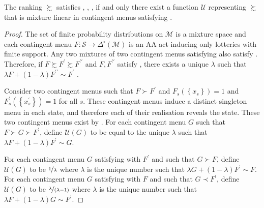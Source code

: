 \begin{lemma}\label{lem:pre2}
	The ranking \(\succsim\) satisfies , , ,  if and only there exist a function \( \mathscr{U} \) representing \( \succsim \) that is mixture linear in contingent menus satisfying .
\end{lemma}

\begin{proof}
	The set of finite probability distributions on \(\mathcal{M}\) is a mixture space and each contingent menu \( F : \mathcal{S} \rightarrow \Delta^{\circ} \left( \mathcal{M} \right) \) is an AA act inducing only lotteries with finite support. Any two mixtures of two contingent menus satisfying  also satisfy . Therefore, if \( F \succsim F^{\prime} \succsim F^{\prime \prime} \) and \( F, F^{\prime \prime} \) satisfy , there exists a unique \( \lambda \) such that \( \lambda F + \left( 1 - \lambda \right) F^{\prime \prime} \sim F^{\prime} \) \citep[Theorem 8.3 pag. 112]{fishburnUtilityTheoryDecision1970}.

	Consider two contingent menus such that \( F \succ F^{\prime} \) and \( F_{s} \left( \left\{ x_{s} \right\} \right) = 1 \) and \( F^{\prime}_{s} \left( \left\{ x^{\prime}_{s} \right\} \right) = 1 \) for all \( s \). These contingent menus induce a distinct singleton menu in each state, and therefore each of their realisation reveals the state. These two contingent menus exist by . For each contingent menu \( G \) such that \( F \succ G \succ F^{\prime} \), define \( \mathscr{U} \left( G \right) \) to be equal to the unique \( \lambda \) such that \( \lambda F + \left( 1 - \lambda \right) F^{\prime} \sim G \).

	For each contingent menu \( G \) satisfying  with \( F^{\prime} \) and such that \( G \succ F \), define \( \mathscr{U} \left( G \right) \) to be \( \nicefrac{1}{\lambda} \) where \( \lambda \) is the unique number such that \( \lambda G + \left( 1 - \lambda \right) F^{\prime} \sim F \). For each contingent menu \( G \) satisfying  with \( F \) and such that \( G \prec F^{\prime} \), define \( \mathscr{U} \left( G \right) \) to be \( \nicefrac{\lambda}{\left( \lambda - 1 \right)} \) where \( \lambda \) is the unique number such that \( \lambda F + \left( 1 - \lambda \right) G \sim F^{\prime} \).


\end{proof}
